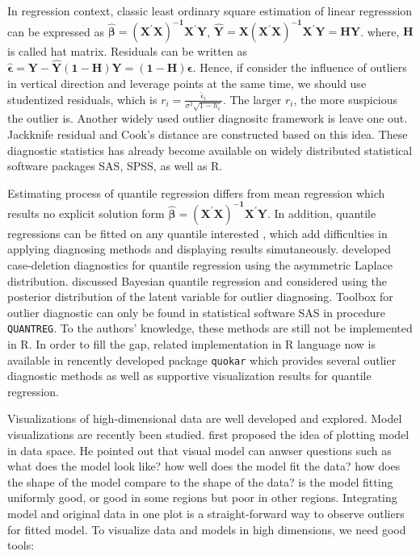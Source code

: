 \documentclass[11pt,a4paper,]{article}
\theoremstyle{definition}
\theoremstyle{definition}
\theoremstyle{remark}
\begin{document}
In regression context, classic least ordinary square estimation of
linear regresssion can be expressed as
\(\hat{\boldsymbol{\beta}}=\boldsymbol{(X^{'}X)^{-1}X^{'}Y}\),
\(\hat{\boldsymbol{Y}}=\boldsymbol{X(X^{'}X)^{-1}X^{'}Y}=\boldsymbol{HY}\).
where, \(\boldsymbol{H}\) is called hat matrix. Residuals can be written
as
\(\hat{\boldsymbol{\epsilon}}=\boldsymbol{Y-\hat{Y}(1-H)Y}=\boldsymbol{(1-H)\epsilon}\).
Hence, if consider the influence of outliers in vertical direction and
leverage points at the same time, we should use studentized residuals,
which is \(r_i=\frac{\hat{\epsilon}_{i}}{\sigma^{2}\sqrt{1-h_i}}\). The
larger \(r_i\), the more suspicious the outlier is. Another widely used
outlier diagnositc framework is leave one out. Jackknife residual and
Cook's distance are constructed based on this idea. These diagnostic
statistics has already become available on widely distributed
statistical software packages SAS, SPSS, as well as R.

Estimating process of quantile regression differs from mean regression
which results no explicit solution form
\(\hat{\boldsymbol{\beta}}=\boldsymbol{(X^{'}X)^{-1}X^{'}Y}\). In
addition, quantile regressions can be fitted on any quantile interested
, which add difficulties in applying diagnosing methods and displaying
results simutaneously. \textcite{sanchez2013likelihood} developed
case-deletion diagnostics for quantile regression using the asymmetric
Laplace distribution. \textcite{santos2016bayesian} discussed Bayesian
quantile regression and considered using the posterior distribution of
the latent variable for outlier diagnosing. Toolbox for outlier
diagnostic can only be found in statistical software SAS in procedure
\texttt{QUANTREG}. To the authors' knowledge, these methods are still
not be implemented in R. In order to fill the gap, related
implementation in R language now is available in rencently developed
package \texttt{quokar} which provides several outlier diagnostic
methods as well as supportive visualization results for quantile
regression.

Visualizations of high-dimensional data are well developed and explored.
Model visualizations are recently been studied.
\textcite{wickham2015visualizing} first proposed the idea of plotting
model in data space. He pointed out that visual model can anwser
questions such as what does the model look like? how well does the model
fit the data? how does the shape of the model compare to the shape of
the data? is the model fitting uniformly good, or good in some regions
but poor in other regions. Integrating model and original data in one
plot is a straight-forward way to observe outliers for fitted model. To
visualize data and models in high dimensions, we need good tools:
\end{document}
